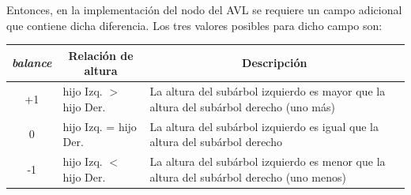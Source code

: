 Entonces, en la implementación del nodo del AVL se requiere un campo adicional que contiene dicha diferencia. Los tres valores posibles para dicho campo son:
\begin{table}[h]
\begin{tabular}{cll}
\hline
\textit{balance} & \multicolumn{1}{c}{Relación de altura} & \multicolumn{1}{c}{Descripción}                                                          \\ \hline
+1      & hijo Izq. $>$ hijo Der.       & La altura del subárbol izquierdo es mayor que la altura del subárbol derecho (uno más) \\
0       & hijo Izq. = hijo Der.                  & La altura del subárbol izquierdo es igual que la altura del subárbol derecho             \\
-1      & hijo Izq. $<$ hijo Der.          & La altura del subárbol izquierdo es menor que la altura del subárbol derecho (uno menos)
\end{tabular}
\end{table}

